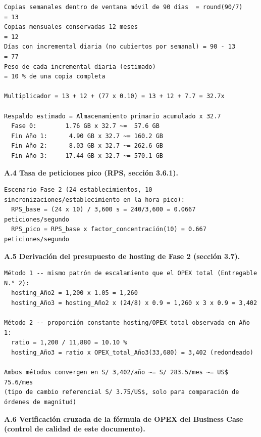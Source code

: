 \documentclass[11pt,a4paper]{article}
\begin{document}
\begin{samepage}\begin{verbatim}
Copias semanales dentro de ventana móvil de 90 días  = round(90/7)          = 13
Copias mensuales conservadas 12 meses                                       = 12
Días con incremental diaria (no cubiertos por semanal) = 90 - 13            = 77
Peso de cada incremental diaria (estimado)                                  = 10 % de una copia completa

Multiplicador = 13 + 12 + (77 x 0.10) = 13 + 12 + 7.7 = 32.7x

Respaldo estimado = Almacenamiento primario acumulado x 32.7
  Fase 0:        1.76 GB x 32.7 ~=  57.6 GB
  Fin Año 1:      4.90 GB x 32.7 ~= 160.2 GB
  Fin Año 2:      8.03 GB x 32.7 ~= 262.6 GB
  Fin Año 3:     17.44 GB x 32.7 ~= 570.1 GB
\end{verbatim}\end{samepage}

\textbf{A.4 Tasa de peticiones pico (RPS, sección 3.6.1).}

\begin{samepage}\begin{verbatim}
Escenario Fase 2 (24 establecimientos, 10 sincronizaciones/establecimiento en la hora pico):
  RPS_base = (24 x 10) / 3,600 s = 240/3,600 = 0.0667 peticiones/segundo
  RPS_pico = RPS_base x factor_concentración(10) = 0.667 peticiones/segundo
\end{verbatim}\end{samepage}

\textbf{A.5 Derivación del presupuesto de hosting de Fase 2 (sección 3.7).}

\begin{samepage}\begin{verbatim}
Método 1 -- mismo patrón de escalamiento que el OPEX total (Entregable N.° 2):
  hosting_Año2 = 1,200 x 1.05 = 1,260
  hosting_Año3 = hosting_Año2 x (24/8) x 0.9 = 1,260 x 3 x 0.9 = 3,402

Método 2 -- proporción constante hosting/OPEX total observada en Año 1:
  ratio = 1,200 / 11,880 = 10.10 %
  hosting_Año3 = ratio x OPEX_total_Año3(33,680) = 3,402 (redondeado)

Ambos métodos convergen en S/ 3,402/año ~= S/ 283.5/mes ~= US$ 75.6/mes
(tipo de cambio referencial S/ 3.75/US$, solo para comparación de órdenes de magnitud)
\end{verbatim}\end{samepage}

\textbf{A.6 Verificación cruzada de la fórmula de OPEX del Business Case (control de calidad de este documento).}
\end{document}
